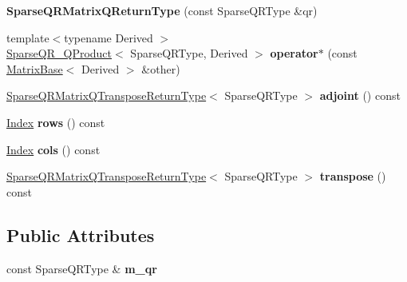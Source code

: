 \begin{DoxyCompactItemize}
\item 
\mbox{\label{struct_eigen_1_1_sparse_q_r_matrix_q_return_type_abc812ddc00be7a2064aebaf2391b38db}} 
{\bfseries Sparse\+Q\+R\+Matrix\+Q\+Return\+Type} (const Sparse\+Q\+R\+Type \&qr)
\item 
\mbox{\label{struct_eigen_1_1_sparse_q_r_matrix_q_return_type_a3f62d406e5a92ac8d8d34a69f29d3b94}} 
{\footnotesize template$<$typename Derived $>$ }\\\hyperlink{struct_eigen_1_1_sparse_q_r___q_product}{Sparse\+Q\+R\+\_\+\+Q\+Product}$<$ Sparse\+Q\+R\+Type, Derived $>$ {\bfseries operator$\ast$} (const \hyperlink{group___core___module_class_eigen_1_1_matrix_base}{Matrix\+Base}$<$ Derived $>$ \&other)
\item 
\mbox{\label{struct_eigen_1_1_sparse_q_r_matrix_q_return_type_a0902d548d7f36fea171283e6fa865d9d}} 
\hyperlink{struct_eigen_1_1_sparse_q_r_matrix_q_transpose_return_type}{Sparse\+Q\+R\+Matrix\+Q\+Transpose\+Return\+Type}$<$ Sparse\+Q\+R\+Type $>$ {\bfseries adjoint} () const
\item 
\mbox{\label{struct_eigen_1_1_sparse_q_r_matrix_q_return_type_a93c8c61654bf112f42db9c61969b94eb}} 
\hyperlink{group___core___module_a554f30542cc2316add4b1ea0a492ff02}{Index} {\bfseries rows} () const
\item 
\mbox{\label{struct_eigen_1_1_sparse_q_r_matrix_q_return_type_add2a611eb8ecf1927f6ca326d86801e0}} 
\hyperlink{group___core___module_a554f30542cc2316add4b1ea0a492ff02}{Index} {\bfseries cols} () const
\item 
\mbox{\label{struct_eigen_1_1_sparse_q_r_matrix_q_return_type_a852f381b6742ef40f5168b54f8b95c1c}} 
\hyperlink{struct_eigen_1_1_sparse_q_r_matrix_q_transpose_return_type}{Sparse\+Q\+R\+Matrix\+Q\+Transpose\+Return\+Type}$<$ Sparse\+Q\+R\+Type $>$ {\bfseries transpose} () const
\end{DoxyCompactItemize}
\subsection*{Public Attributes}
\begin{DoxyCompactItemize}
\item 
\mbox{\label{struct_eigen_1_1_sparse_q_r_matrix_q_return_type_aa1d9e2125f025ce96d4199ebe4181de4}} 
const Sparse\+Q\+R\+Type \& {\bfseries m\+\_\+qr}
\end{DoxyCompactItemize}



